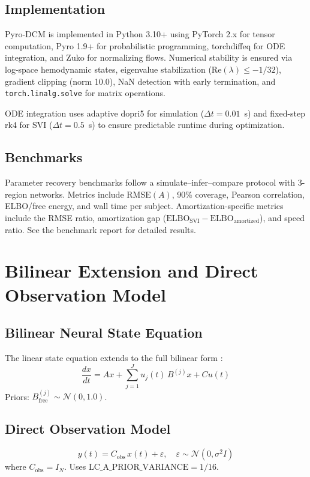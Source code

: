 \subsection{Implementation}

Pyro-DCM is implemented in Python 3.10+ using PyTorch 2.x for tensor
computation, Pyro 1.9+ for probabilistic programming, torchdiffeq for
ODE integration, and Zuko for normalizing flows. Numerical stability is
ensured via log-space hemodynamic states, eigenvalue stabilization
($\text{Re}(\lambda) \leq -1/32$), gradient clipping (norm 10.0),
NaN detection with early termination, and \texttt{torch.linalg.solve}
for matrix operations.

ODE integration uses adaptive dopri5 for simulation ($\Delta t = 0.01$~s)
and fixed-step rk4 for SVI ($\Delta t = 0.5$~s) to ensure predictable
runtime during optimization.

\subsection{Benchmarks}

Parameter recovery benchmarks follow a simulate--infer--compare protocol
with 3-region networks. Metrics include RMSE$(A)$, 90\% coverage,
Pearson correlation, ELBO/free energy, and wall time per subject.
Amortization-specific metrics include the RMSE ratio, amortization gap
($\text{ELBO}_\text{SVI} - \text{ELBO}_\text{amortized}$), and speed
ratio. See the benchmark report for detailed results.


\section{Bilinear Extension and Direct Observation Model}

\subsection{Bilinear Neural State Equation}
The linear state equation extends to the full bilinear form \citep{friston2003}:
\begin{equation}
  \frac{dx}{dt} = Ax + \sum_{j=1}^{J} u_j(t)\, B^{(j)} x + Cu(t)
  \label{eq:bilinear-state}
\end{equation}
Priors: $B^{(j)}_\text{free} \sim \mathcal{N}(0, 1.0)$.

\subsection{Direct Observation Model}
\begin{equation}
  y(t) = C_\text{obs}\, x(t) + \varepsilon, \quad
  \varepsilon \sim \mathcal{N}(0, \sigma^2 I)
  \label{eq:direct-obs}
\end{equation}
where $C_\text{obs} = I_N$. Uses $\text{LC\_A\_PRIOR\_VARIANCE} = 1/16$.

